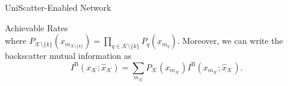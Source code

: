 \documentclass[journal]{IEEEtran}
\begin{document}
\begin{section}{UniScatter-Enabled Network}
\begin{subsection}{Achievable Rates}
\begin{equation}
			\label{eq:backscatter_marginal_information}
		\end{equation}
		where $P_{\mathcal{K} \setminus \{k\}}(x_{m_{\mathcal{K} \setminus \{k\}}}) = \prod_{q \in \mathcal{K} \setminus \{k\}} P_{q}(x_{m_{q}})$.
		Moreover, we can write the backscatter mutual information as
		\begin{equation}
			I^{\mathrm{B}}(x_{\mathcal{K}};\hat{x}_{\mathcal{K}}) = \sum_{m_{\mathcal{K}}} P_{\mathcal{K}}(x_{m_{\mathcal{K}}}) I^{\mathrm{B}}(x_{m_{\mathcal{K}}};\hat{x}_{\mathcal{K}}).
			\label{eq:backscatter_mutual_information}
		\end{equation}



\end{subsection}
\end{section}
\end{document}
